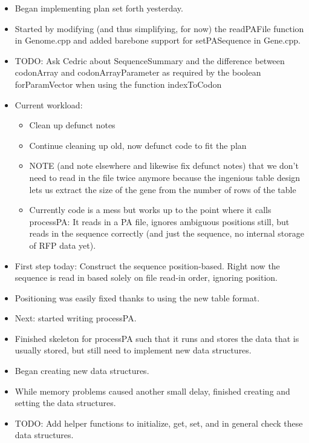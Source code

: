 \documentclass[12pt,hyperref]{labbook}
\begin{document}
\begin{itemize}
    \item Began implementing plan set forth yesterday.
    \item Started by modifying (and thus simplifying, for now) the readPAFile function in Genome.cpp and added barebone support for setPASequence in Gene.cpp.
    \item TODO: Ask Cedric about SequenceSummary and the difference between codonArray and codonArrayParameter as required by the boolean forParamVector when using the function indexToCodon
    \item Current workload:
    \begin{itemize}
        \item Clean up defunct notes
        \item Continue cleaning up old, now defunct code to fit the plan
        \item NOTE (and note elsewhere and likewise fix defunct notes) that we don't need to read in the file twice anymore because the ingenious table design lets us extract the size of the gene from the number of rows of the table
        \item Currently code is a mess but works up to the point where it calls processPA: It reads in a PA file, ignores ambiguous positions still, but reads in the sequence correctly (and just the sequence, no internal storage of RFP data yet).
    \end{itemize}
\end{itemize}


\begin{itemize}
    \item First step today: Construct the sequence position-based.
    Right now the sequence is read in based solely on file read-in order, ignoring position.
    \item Positioning was easily fixed thanks to using the new table format.
    \item Next: started writing processPA.
    \item Finished skeleton for processPA such that it runs and stores the data that is usually stored, but still need to implement new data structures.
\end{itemize}


\begin{itemize}
    \item Began creating new data structures.
    \item While memory problems caused another small delay, finished creating and setting the data structures.
    \item TODO: Add helper functions to initialize, get, set, and in general check these data structures.
\end{itemize}
\end{document}
